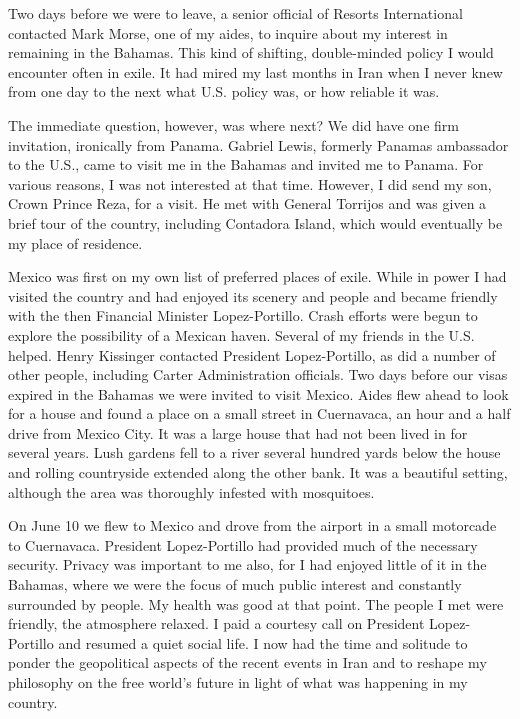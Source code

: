 Two days before we were to leave, a senior official of Resorts International contacted Mark Morse, one of my aides, to inquire about my interest in remaining in the Bahamas. This kind of shifting, double-minded policy I would encounter often in exile. It had mired my last months in Iran when I never knew from one day to the next what U.S. policy was, or how reliable it was. 

The immediate question, however, was where next? We did have one firm invitation, ironically from Panama. Gabriel Lewis, formerly Panamas ambassador to the U.S., came to visit me in the Bahamas and invited me to Panama. For various reasons, I was not interested at that time. However, I did send my son, Crown Prince Reza, for a visit. He met with General Torrijos and was given a brief tour of the country, including Contadora Island, which would eventually be my place of residence. 

Mexico was first on my own list of preferred places of exile. While in power I had visited the country and had enjoyed its scenery and people and became friendly with the then Financial Minister Lopez-Portillo. Crash efforts were begun to explore the possibility of a Mexican haven. Several of my friends in the U.S. helped. Henry Kissinger contacted President Lopez-Portillo, as did a number of other people, including Carter Administration officials. Two days before our visas expired in the Bahamas we were invited to visit Mexico. Aides flew ahead to look for a house and found a place on a small street in Cuernavaca, an hour and a half drive from Mexico City. It was a large house that had not been lived in for several years. Lush gardens fell to a river several hundred yards below the house and rolling countryside extended along the other bank. It was a beautiful setting, although the area was thoroughly infested with mosquitoes. 

On June 10 we flew to Mexico and drove from the airport in a small motorcade to Cuernavaca. President Lopez-Portillo had provided much of the necessary security. Privacy was important to me also, for I had enjoyed little of it in the Bahamas, where we were the focus of much public interest and constantly surrounded by people. My health was good at that point. The people I met were friendly, the atmosphere relaxed. I paid a courtesy call on President Lopez-Portillo and resumed a quiet social life. I now had the time and solitude to ponder the geopolitical aspects of the recent events in Iran and to reshape my philosophy on the free world’s future in light of what was happening in my country. 

